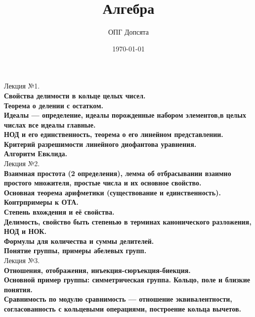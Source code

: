 \documentclass[12pt]{article}
\title{Алгебра}
\author{ОПГ Допсята}
\date{\today}
\begin{document}
\maketitle
\large

Лекция №1.\\
\textbf{Свойства делимости в кольце целых чисел.}\\

\textbf{Теорема о делении с остатком.}\\

\textbf{Идеалы — определение, идеалы порожденные набором элементов,в целых числах все идеалы главные.}\\

\textbf{НОД и его единственность, теорема о его линейном представлении.}\\

\textbf{Критерий разрешимости линейного диофантова уравнения.}\\

\textbf{Алгоритм Евклида.}\\

Лекция №2.\\
\textbf{Взаимная простота (2 определения), лемма об отбрасывании взаимно простого множителя, простые числа и их основное свойство.}\\

\textbf{Основная теорема арифметики (существование и единственность). Контрпримеры к ОТА.}\\

\textbf{Степень вхождения и её свойства.}\\

\textbf{Делимость, свойство быть степенью в терминах канонического разложения, НОД и НОК.}\\

\textbf{Формулы для количества и суммы делителей.}\\

\textbf{Понятие группы, примеры абелевых групп.}\\

Лекция №3.\\
\textbf{Отношения, отображения, инъекция-сюръекция-биекция.}\\

\textbf{Основной пример группы: симметрическая группа. Кольцо, поле и близкие понятия.}\\

\textbf{Сравнимость по модулю сравнимость — отношение эквивалентности, согласованность с кольцевыми операциями, построение кольца вычетов.}\\
\end{document}
